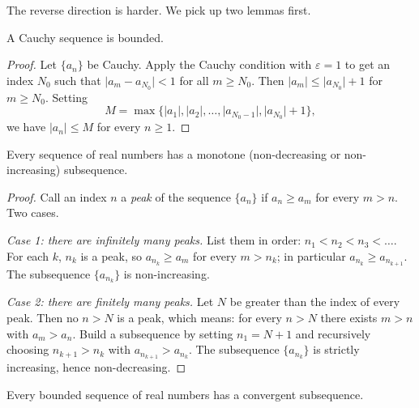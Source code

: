 The reverse direction is harder. We pick up two lemmas first.

\begin{lemma}\label{lem:cauchy-bounded}
A Cauchy sequence is bounded.
\end{lemma}

\begin{proof}
Let \(\{a_{n}\}\) be Cauchy. Apply the Cauchy condition with \(\varepsilon = 1\) to get an index \(N_{0}\) such that \(\lvert a_{m} - a_{N_{0}} \rvert < 1\) for all \(m \geq N_{0}\). Then \(\lvert a_{m} \rvert \leq \lvert a_{N_{0}} \rvert + 1\) for \(m \geq N_{0}\). Setting
\[
M = \max\bigl\{\lvert a_{1} \rvert, \lvert a_{2} \rvert, \dots, \lvert a_{N_{0} - 1} \rvert, \lvert a_{N_{0}} \rvert + 1\bigr\},
\]
we have \(\lvert a_{n} \rvert \leq M\) for every \(n \geq 1\).
\end{proof}

\begin{lemma}\label{lem:monotone-subsequence}
Every sequence of real numbers has a monotone (non-decreasing or non-increasing) subsequence.
\end{lemma}

\begin{proof}
Call an index \(n\) a \emph{peak} of the sequence \(\{a_{n}\}\) if \(a_{n} \geq a_{m}\) for every \(m > n\). Two cases.

\emph{Case 1: there are infinitely many peaks.} List them in order: \(n_{1} < n_{2} < n_{3} < \dots\). For each \(k\), \(n_{k}\) is a peak, so \(a_{n_{k}} \geq a_{m}\) for every \(m > n_{k}\); in particular \(a_{n_{k}} \geq a_{n_{k + 1}}\). The subsequence \(\{a_{n_{k}}\}\) is non-increasing.

\emph{Case 2: there are finitely many peaks.} Let \(N\) be greater than the index of every peak. Then no \(n > N\) is a peak, which means: for every \(n > N\) there exists \(m > n\) with \(a_{m} > a_{n}\). Build a subsequence by setting \(n_{1} = N + 1\) and recursively choosing \(n_{k + 1} > n_{k}\) with \(a_{n_{k + 1}} > a_{n_{k}}\). The subsequence \(\{a_{n_{k}}\}\) is strictly increasing, hence non-decreasing.
\end{proof}

\begin{theorem}\label{thm:bolzano-weierstrass}
Every bounded sequence of real numbers has a convergent subsequence.
\end{theorem}

